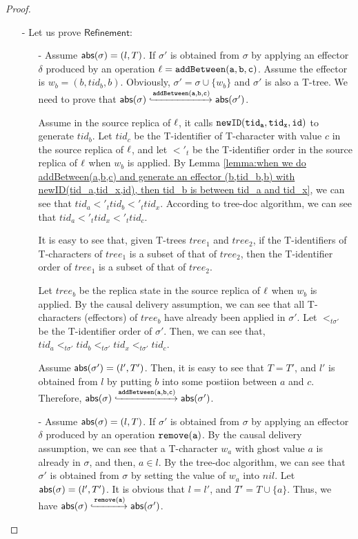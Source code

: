 \begin {proof}
\begin{itemize}
\item[-] Let us prove $\mathsf{Refinement}$:
    \begin{itemize}
    \setlength{\itemsep}{0.5pt}
    \item[-] Assume $\mathsf{abs}(\sigma) = (l,T)$. If $\sigma'$ is obtained from $\sigma$ by applying an effector $\delta$ produced by an operation $\alabel = \alabelshort[{\tt addBetween}]{a,b,c}$. Assume the effector is $w_b = (b,tid_b,b)$. Obviously, $\sigma' = \sigma \cup \{ w_b \}$ and $\sigma'$ is also a T-tree. We need to prove that $\refmap(\sigma) \specarrow{\alabelshort[{\tt addBetween}]{a,b,c}} \refmap(\sigma')$.

        Assume in the source replica of $\ell$, it calls $\alabelshort[{\tt newID}]{tid_a,tid_x,id}$ to generate $tid_b$. Let $tid_c$ be the T-identifier of T-character with value $c$ in the source replica of $\ell$, and let $<'_t$ be the T-identifier order in the source replica of $\ell$ when $w_b$ is applied. By Lemma \ref{lemma:when we do addBetween(a,b,c) and generate an effector (b,tid_b,b) with newID(tid_a,tid_x,id), then tid_b is between tid_a and tid_x}, we can see that $tid_a <'_t tid_b <'_t tid_x$. According to tree-doc algorithm, we can see that $tid_a <'_t tid_x <'_t tid_c$.

        It is easy to see that, given T-trees $tree_1$ and $tree_2$, if the T-identifiers of T-characters of $tree_1$ is a subset of that of $tree_2$, then the T-identifier order of $tree_1$ is a subset of that of $tree_2$.

        Let $tree_b$ be the replica state in the source replica of $\ell$ when $w_b$ is applied. By the causal delivery assumption, we can see that all T-characters (effectors) of $tree_b$ have already been applied in $\sigma'$. Let $<_{t\sigma'}$ be the T-identifier order of $\sigma'$. Then, we can see that, $tid_a <_{t\sigma'} tid_b <_{t\sigma'} tid_x <_{t\sigma'} tid_c$.

        Assume $\mathsf{abs}(\sigma') = (l',T')$. Then, it is easy to see that $T = T'$, and $l'$ is obtained from $l$ by putting $b$ into some postiion between $a$ and $c$. Therefore, $\refmap(\sigma) \specarrow{\alabelshort[{\tt addBetween}]{a,b,c}} \refmap(\sigma')$.

    \item[-] Assume $\mathsf{abs}(\sigma) = (l,T)$. If $\sigma'$ is obtained from $\sigma$ by applying an effector $\delta$ produced by an operation $\alabelshort[{\tt remove}]{a}$. By the causal delivery assumption, we can see that a T-character $w_a$ with ghost value $a$ is already in $\sigma$, and then, $a \in l$. By the tree-doc algorithm, we can see that $\sigma'$ is obtained from $\sigma$ by setting the value of $w_a$ into $nil$. Let $\mathsf{abs}(\sigma) = (l',T')$. It is obvious that $l=l'$, and $T' = T \cup \{ a \}$. Thus, we have $\refmap(\sigma) \specarrow{\alabelshort[{\tt remove}]{a}} \refmap(\sigma')$.


\end{itemize}
\end{itemize}
\end{proof}
